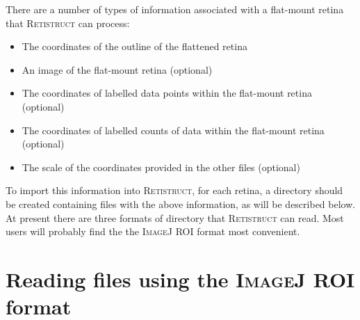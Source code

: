\documentclass{book}
\begin{document}
There are a number of types of information associated with a
flat-mount retina that \textsc{Retistruct} can process:
\begin{itemize}
\item The coordinates of the outline of the flattened retina
\item An image of the flat-mount retina (optional)
\item The coordinates of labelled data points within the flat-mount
  retina (optional)
\item The coordinates of labelled counts of data within the flat-mount
  retina (optional)
\item The scale of the coordinates provided in the other files
  (optional)
\end{itemize}
To import this information into \textsc{Retistruct}, for each retina,
a directory should be created containing files with the above
information, as will be described below.  At present there are three
formats of directory that \textsc{Retistruct} can read.  Most users
will probably find the the \textsc{ImageJ} ROI format most convenient.

\section{Reading files using the \textsc{ImageJ} ROI format}
\label{retistruct-manual:sec:ijroi-format}
\end{document}
